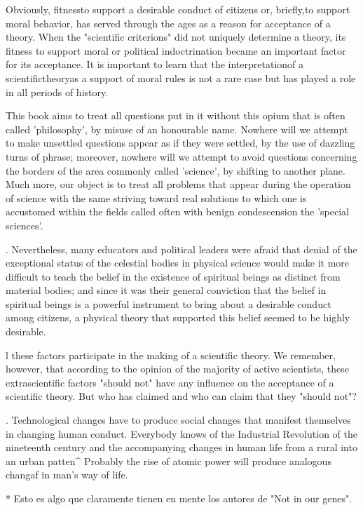 Obviously, fitnessto support a desirable conduct of citizens or, briefly,to
support moral behavior, has served through the ages as a reason for acceptance
of a theory. When the "scientific criterions" did not uniquely determine a
theory, its fitness to support moral or political indoctrination became an
important factor for its acceptance. It is important to learn that the
interpretationof a scientifictheoryas a support of moral rules is not a rare
case but has played a role in all periods of history.

This book aims to treat all questions put in it without this opium  that is
often called 'philosophy', by misuse of an honourable name.  Nowhere will we
attempt to make unsettled questions appear as if they  were settled, by the use
of dazzling turns of phrase; moreover,  nowhere will we attempt to avoid
questions concerning the borders of  the area commonly called 'science', by
shifting to another plane. Much  more, our object is to treat all problems that
appear during the  operation of science with the same striving toward real
solutions to  which one is accustomed within the fields called often with benign
condescension the 'special sciences'.

. Nevertheless, many educators and political leaders were afraid that denial of
the exceptional status of the celestial bodies in physical science would make it
more difficult to teach the belief in the existence of spiritual beings as
distinct from material bodies; and since it was their general conviction that
the belief in spiritual beings is a powerful instrument to bring about a
desirable conduct among citizens, a physical theory that supported this belief
seemed to be highly desirable.

l these factors participate in the making of a scientific theory. We remember,
however, that according to the opinion of the majority of active scientists,
these extrascientific factors "should not" have any influence on the acceptance
of a scientific theory. But who has claimed and who can claim that they "should
not"?

. Technological changes have to produce social changes that manifest themselves
in changing human conduct. Everybody knows of the Industrial Revolution of the
nineteenth century and the accompanying changes in human life from a rural into
an urban patten^ Probably the rise of atomic power will produce analogous
changaf in man's way of life.


* Esto es algo que claramente tienen en mente los autores de "Not in our genes".


